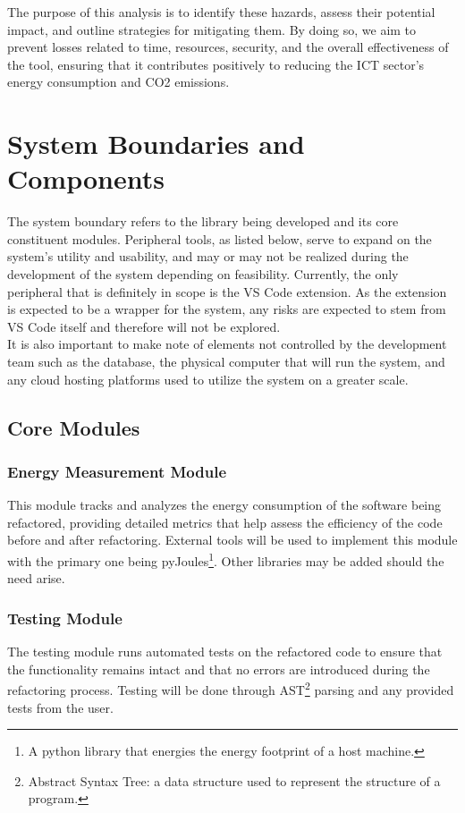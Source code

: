 \documentclass{article}
\newcounter{hazard}
\begin{document}
The purpose of this analysis is to identify these hazards, assess their potential 
impact, and outline strategies for mitigating them. By doing so, we aim to prevent 
losses related to time, resources, security, and the overall effectiveness of the 
tool, ensuring that it contributes positively to reducing the ICT sector's energy 
consumption and CO2 emissions.

\section{System Boundaries and Components}

The system boundary refers to the library being developed and its core constituent modules. Peripheral tools, as listed below, serve to expand on the system's utility and usability, and may or may not be realized during the development of the system depending on feasibility. Currently, the only peripheral that is definitely in scope is the VS Code extension. As the extension is expected to be a wrapper for the system, any risks are expected to stem from VS Code itself and therefore will not be explored. \\

It is also important to make note of elements not controlled by the development team such as the database, the physical computer that will run the system, and any cloud hosting platforms used to utilize the system on a greater scale.

\subsection{Core Modules}

\subsubsection*{Energy Measurement Module}
This module tracks and analyzes the energy consumption of the software being refactored, providing detailed metrics that help assess the efficiency of the code before and after refactoring. External tools will be used to implement this module with the primary one being pyJoules\footnote{A python library that energies the energy footprint of a host machine.}. Other libraries may be added should the need arise. 

\subsubsection*{Testing Module}
The testing module runs automated tests on the refactored code to ensure that the functionality remains intact and that no errors are introduced during the refactoring process. Testing will be done through AST\footnote{Abstract Syntax Tree: a data structure used to represent the structure of a program.} parsing and any provided tests from the user.
\end{document}
